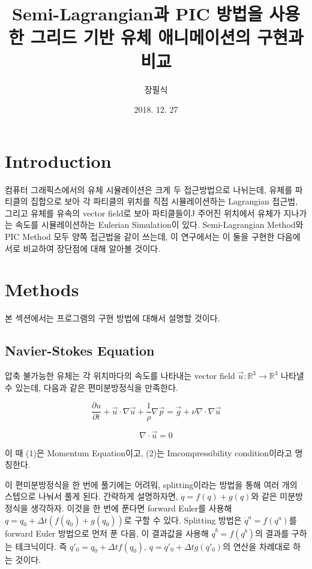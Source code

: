 \documentclass[10pt, A4]{article}
\title{Semi-Lagrangian과 PIC 방법을 사용한 그리드 기반 유체 애니메이션의 구현과 비교}
\author{장필식}
\date{2018. 12. 27}
\begin{document}
\maketitle

\begin{abstract}
\end{abstract}

\newpage

\tableofcontents

\newpage

\section{Introduction}

컴퓨터 그래픽스에서의 유체 시뮬레이션은 크게 두 접근방법으로 나뉘는데, 유체를 파티클의 집합으로 보아 각 파티클의 위치를 직접 시뮬레이션하는 Lagrangian 접근법, 그리고 유체를 유속의 vector field로 보아 파티클들이J 주어진 위치에서 유체가 지나가는 속도를 시뮬레이션하는 Eulerian Simulation이 있다. Semi-Lagrangian Method와 PIC Method 모두 양쪽 접근법을 같이 쓰는데, 이 연구에서는 이 둘을 구현한 다음에 서로 비교하여 장단점에 대해 알아볼 것이다.

\section{Methods}

본 섹션에서는 프로그램의 구현 방법에 대해서 설명할 것이다.

\subsection{Navier-Stokes Equation}

압축 불가능한 유체는 각 위치마다의 속도를 나타내는 vector field $\vec{u} : \mathbb{R}
^3 \rightarrow \mathbb{R}^3$ 나타낼 수 있는데, 다음과 같은 편미분방정식을 만족한다.

\begin{equation}
  \frac{\partial u}{\partial t} + \vec{u} \cdot \nabla{\vec{u}} + \frac{1}{\rho} \nabla{\vec{p}} = \vec{g} + \nu \nabla \cdot \nabla \vec{u}
\end{equation}

\begin{equation}
  \nabla \cdot \vec{u} = 0
\end{equation}

이 때 (1)은 Momentum Equation이고, (2)는 Imcompressibility condition이라고 명칭한다. 

이 편미분방정식을 한 번에 풀기에는 어려워, splitting이라는 방법을 통해 여러 개의 스텝으로 나눠서 풀게 된다.
간략하게 설명하자면, $\dot q = f(q) + g(q)$와 같은 미분방정식을 생각하자.
이것을 한 번에 푼다면 forward Euler를 사용해 $q = q_0 + \Delta t (f(q_0) + g(q_0))$로 구할 수 있다.
Splitting 방법은 $\dot q^a = f(q^a)$를 forward Euler 방법으로 먼저 푼 다음, 이 결과값을 사용해 $\dot q^b = f(q^b)$의 결과를 구하는 테크닉이다. 즉 $q'_0 = q_0 + \Delta t f(q_0)$, $q = q'_0 + \Delta t g(q'_0)$의 연산을 차례대로 하는 것이다. \cite[p.17-19]{fluid-sim-cg}
\end{document}
